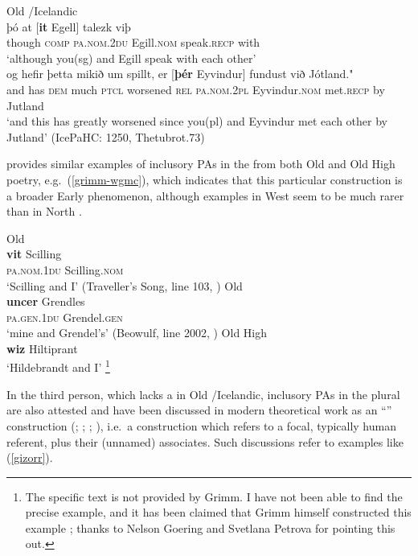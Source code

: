 \documentclass[output=paper,colorlinks,citecolor=brown]{langscibook}
\begin{document}
\ea \label{dual-2nd} 
\ea Old /Icelandic \\
\gll þó at [\textbf{it} Egell] talezk viþ\\
though \textsc{comp} \textsc{pa.nom.2du} Egill.\textsc{nom} speak.\textsc{recp} with\\
\glt `although you(sg) and Egill speak with each other'\\
\citep[p.~124, §395]{heusler1962altislandisches}
\ex  \gll og hefir þetta mikið um spillt, er [\textbf{þér} Eyvindur] fundust við Jótland."\\
and has \textsc{dem} much \textsc{ptcl} worsened \textsc{rel} \textsc{pa.nom.2pl} Eyvindur.\textsc{nom} met.\textsc{recp} by Jutland\\
\glt `and this has greatly worsened since you(pl) and Eyvindur met each other by Jutland' (IcePaHC: 1250, Thetubrot.73)
\z
\z

\citet[350]{grimm1898deutsche} provides similar examples of inclusory PAs in the  from both Old  and Old High  poetry, e.g.~(\ref{grimm-wgmc}), which indicates that this particular construction is a broader Early  phenomenon, although examples in West  seem to be much rarer than in North .

\ea \label{grimm-wgmc}
\ea Old  \\
\gll \textbf{vit} Scilling \\
\textsc{pa.nom.1du} Scilling.\textsc{nom}\\
\glt `Scilling and I' (Traveller's Song, line 103, \citealp[350]{grimm1898deutsche})
\ex Old  \\
\gll \textbf{uncer} Grendles\\
\textsc{pa.gen.1du} Grendel.\textsc{gen}\\
\glt `mine and Grendel's' (Beowulf, line 2002, \citealp[350]{grimm1898deutsche})
\ex Old High \\
\textbf{wiz} Hiltiprant \\
`Hildebrandt and I' \citep[350]{grimm1898deutsche}\footnote{The specific text is not provided by Grimm. I have not been able to find the precise example, and it has been claimed that Grimm himself constructed this example \citep[236, fn.~2]{krause1924entwickelung}; thanks to Nelson Goering and Svetlana Petrova for pointing this out.}
\z 
\z 


In the third person, which lacks a  in Old /Icelandic, inclusory PAs in the plural are also attested and have been discussed in modern theoretical work as an ``'' construction  (\citealp{denbesten1996associative}; \citealp{moravcsik2003semantic}; \citealp{wals-36}; \citealp{sigurdhsson2020we}), i.e.~a construction which refers to a focal, typically human referent, plus their (unnamed) associates. Such discussions refer to examples like (\ref{gizorr}).
\end{document}
